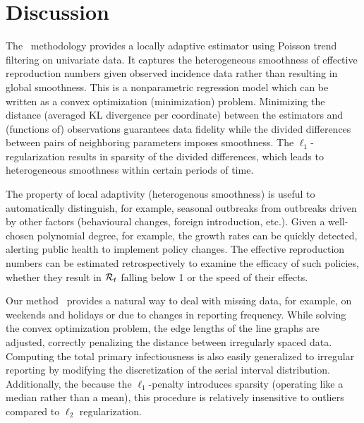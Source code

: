 \section{Discussion}

The \RtEstim\ methodology provides a locally adaptive estimator using Poisson
trend filtering on univariate data. It captures the heterogeneous smoothness of
effective reproduction numbers given observed incidence data rather than
resulting in global smoothness. This is a nonparametric regression model which
can be written as a convex optimization (minimization) problem. Minimizing the
distance (averaged KL divergence per coordinate) between the estimators and
(functions of) observations guarantees data fidelity while the  divided
differences between pairs of neighboring parameters imposes smoothness. The
$\ell_1$-regularization results in sparsity of the divided differences, which
leads to heterogeneous smoothness within certain periods of time. 

The property of local adaptivity (heterogenous smoothness) is useful to
automatically distinguish, for example, seasonal outbreaks from outbreaks driven
by other factors (behavioural changes, foreign introduction, etc.). Given a
well-chosen polynomial degree, for example,
the growth rates can be quickly detected, alerting public health to implement
policy changes. The effective
reproduction numbers can be estimated retrospectively to examine the efficacy of
such policies, whether they result in $\mathcal{R}_t$ falling below 1 or the speed of
their effects.

Our method \RtEstim\ provides a natural way to deal with missing data, for
example, on weekends and holidays or due to changes in reporting frequency.
While solving the convex optimization problem, the edge lengths of the line
graphs are adjusted, correctly penalizing the distance between irregularly
spaced data. Computing the total
primary infectiousness is also easily generalized to irregular reporting by
modifying the discretization of the serial interval distribution. Additionally,
the because the $\ell_1$-penalty introduces sparsity (operating like a median
rather than a mean), this procedure is relatively insensitive to outliers
compared to $\ell_2$ regularization.


